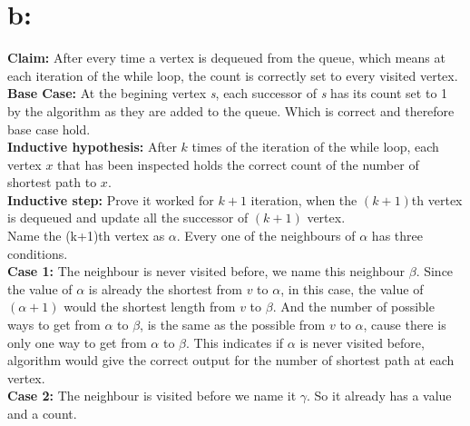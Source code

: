 \documentclass[]{article}
\begin{document}
\section{b:}
\textbf{Claim: } 
After every time a vertex is dequeued from the queue, which means
at each iteration of the while loop, the count is correctly set to every visited
vertex.\\
\textbf{Base Case:} 
At the begining vertex \textit{s}, each successor of \textit{s}
has its count set to 1 by the algorithm as they are added to the queue. Which is
correct and therefore base case hold. \\
\textbf{Inductive hypothesis:} 
After $k$ times of the iteration of the while loop,
each vertex $x$ that has been inspected 
holds the correct count of the number of shortest path to $x$.\\
\textbf{Inductive step:} 
Prove it worked for $k+1$ iteration, when the $(k+1)$th vertex is dequeued and 
update all the successor of $(k+1)$ vertex.\\
Name the (k+1)th vertex as $\alpha$. Every one of the neighbours of $\alpha$
has three conditions.\\
\textbf{Case 1:} 
The neighbour is never visited before, we name this neighbour $\beta$. Since the value of 
$\alpha$ is already the shortest from $v$ to $\alpha$, in this case, the value
of $(\alpha +1)$ would the shortest length from $v$ to $\beta$. And
the number of possible ways to get from $\alpha$ to $\beta$, is the 
same as the possible from $v$ to $\alpha$, cause there is only one way to get from
$\alpha$ to $\beta$. This indicates if $\alpha$ is never visited before, algorithm
would give the correct output for the number of shortest path at each vertex.\\
\textbf{Case 2:}
The neighbour is visited before we name it $\gamma$. So it already has a value and a count.
\end{document}
